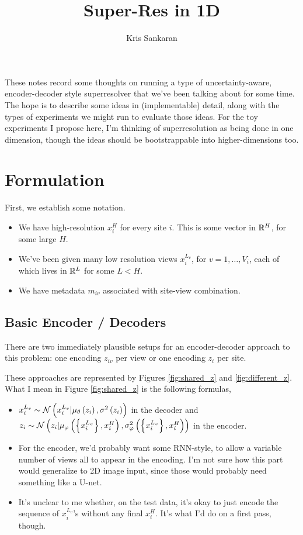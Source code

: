 \documentclass{article}
\title{Super-Res in 1D}
\author{Kris Sankaran}
\begin{document}
\maketitle

These notes record some thoughts on running a type of uncertainty-aware,
encoder-decoder style superresolver that we've been talking about for some time.
The hope is to describe some ideas in (implementable) detail, along with the
types of experiments we might run to evaluate those ideas. For the toy
experiments I propose here, I'm thinking of superresolution as being done in one
dimension, though the ideas should be bootstrappable into higher-dimensions too.

\section{Formulation}

First, we establish some notation.

\begin{itemize}
\item We have high-resolution $x_{i}^{H}$ for every site $i$. This is some vector
in $\mathbb{R}^H$, for some large $H$.

\item We've been given many low resolution views $x_i^{L_v}$, for $v = 1,\dots,
  V_i$, each of which lives in $\mathbb{R}^{L}$ for some $L < H$.
\item We have metadata $m_{iv}$ associated with site-view combination.
\end{itemize}

\subsection{Basic Encoder / Decoders}
\label{subsec:label}

There are two immediately plausible setups for an encoder-decoder approach to
this problem: one encoding $z_{iv}$ per view or one encoding $z_i$ per site.

These approaches are represented by Figures \ref{fig:shared_z} and
\ref{fig:different_z}. What I mean in Figure \ref{fig:shared_z} is the
following formulas,
\begin{itemize}
\item $x_{i}^{L_v} \sim \mathcal{N}\left(x_i^{L_v} \vert \mu_{\theta}\left(z_i\right),
  \sigma^{2}\left(z_i\right)\right)$ in the decoder and $z_i \sim
  \mathcal{N}\left(z_i \vert \mu_{\varphi}\left(\left\{x_i^{L_v}\right\}, x_i^{H}\right),
  \sigma^{2}_{\varphi}\left(\left\{x_i^{L_v}\right\}, x_i^{H}\right)\right)$
  in the encoder.
\item For the encoder, we'd probably want some RNN-style, to allow a variable
  number of views all to appear in the encoding. I'm not sure how this part
  would generalize to 2D image input, since those would probably need something
  like a U-net.
\item It's unclear to me whether, on the test data, it's okay to just encode the
  sequence of $x_i^{L_v}$'s without any final $x_i^{H}$. It's what I'd do on a
  first pass, though.
\end{itemize}
\end{document}

